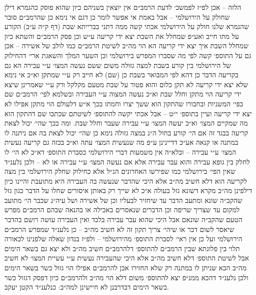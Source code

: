 \documentclass[12pt, openany]{book}
\begin{document}
\begin{multicols}{2}
הלזה – אכן לפ״ז לפמשכ׳ לדעת הרמב״ם אין יוצאין בשניהם כיון שהוא פוסק כהגמרא דילן שחולק על הירושלמי – אבל באמת אי אפשר לומר כן דגם אי נימא כן שהרמב״ם סובר שהגמרא שלנו חולק על הירושלמי אכתי קשה ממה דתני בברייתא שבת (דף ק״ה ע״ב) הקורע על מתו חייב ואע״פ שמחלל את השבת יצא ידי קריעה ע״ש וכן פסק הרמב״ם והשתא כיון שמחלל השבת איך יצא ידי קריעה הא הוי מה״ב לשיטת הרמב״ם כמו לולב של אשירה – אכן גם על התוספ׳ קשה לפי מה שסברו המפרש בירושלמי וכן השער המלך והשאגת ארי׳ דהחילוק של הירושלמי בין קורע בשבת למצה גזולה משום ששם נעשה המצו׳ ע״י עבירה הא גם בקריעה הדבר כן דהא לפי המבואר בשבת כן (שם) לא חייב רק ע״י שמתקן וא״כ אי נימא שלא יצא ידי קריעה לא תקן כלום והוא פטור על שבת מטעם מקלקל ורק ע״י שאמרינן שיצא ידי קריעה הוי מתקן וחלל שבת וא״כ נעשה המצוה ע״י העבירה ובשלמא לפי׳ הרמב״ם שם בפי׳ המשניות ובחבורו שהתקון הוא ששך יצרו וחמתו בכך א״ש דלעולם הוי מתקן אפילו לא יצא ידי קריעה ועיין בתוספ׳ י״ט – אבל אכתי יקשה להתוספ׳ לשיטתם שכתבו שם דהתקון הוא מה שמקיים המצו׳ וא״כ יעשה המצו׳ ע״י עבירה שעבר וחלל שבת. ומה בכך שהי׳ יכול לצאת קריעה בבגד זה אם הי׳ קורע בחול ה״נ במצה גזולה נימא כן שהי׳ יכול לצאת בה אם ניתנה לו במתנה או קנאה אע״כ דדיינינן ע״פ מה שנעשית המצו׳ עתה וא״כ בכזה גם קריעה נעשית המצו׳ ע״י עבירה – ובלא״ה אין משמעות דברי הירושלמי כסברת התוספ׳ דא״כ לא הי׳ לו לחלק בין גופא עבירה והוא עבר עבירה אלא אם נעשה המצו׳ ע״י עבירה או לא – ולכן נלענ״ד שאין הפי׳ בירושלמי כמו שפירשו האחרונים הנ״ל אלא כחילוק שחלק הירושלמי בין מצה לקריעה הוא דלא חשיב מה״ב אלא היכי שהדבר שנעשה בה העבירה היא מתועבת והיינו כיון דילפינן מה״ב מקרא דשונא גזל בעולה א״כ לא שייך רק באותן איסורים שחלו על הדבר כגון גזל שהקב״ה שונא ומתעב הדבר עד שיחזיר לבעליו וכן של אשירה ושל עיה״נ שכבר הי׳ מתועב למקום עד שצריך שריפה וכן הדברים שנאסרים באכילה או בהנאה שבהם הרמב״ם מפרש הטעם שהקב״ה שונאם אבל היכי שהוא עבר עבירה בלבד ואין העבירה עושה רושם בהדבר שיאסר לשום דבר או שיהי׳ צריך תקון זה לא חשיב מה״ב – כן נלענ״ד שמפרש הרמב״ם הירושלמי ועל כן אין ראי׳ לסברת התוספ׳ מהירושלמי – ולפ״ז בנדון שאלה שלפנינו לכאורה תלוי בין פלוגתא שבין הרמב״ם להתוספ׳ דלהרמב״ם חשיב מה״ב ולא יצא גם בשאר הימים אבל לשיטת התוספ׳ דלא חשיב מה״ב אלא היכי שהעבירה נעשית ע״י עשיית המצו׳ לא חשיב מה״ב הכא שניתן לו במתנה רק שלא החזירו אכן להרמב״ם אפילו הוי גזול כשר בשאר הימים ולכן נלענ״ד דהכא ממנ״פ יצא להתוספ׳ משום דלא הוי מה״ב ולהרמב״ם כיון דפסק דגזול כשר בשאר הימים דבדרבנן לא חיישינן למה״ב: כנלענ״ד הקטן יעקב.\\\vspace{0pt}

\end{multicols}\newpage
\end{document}
